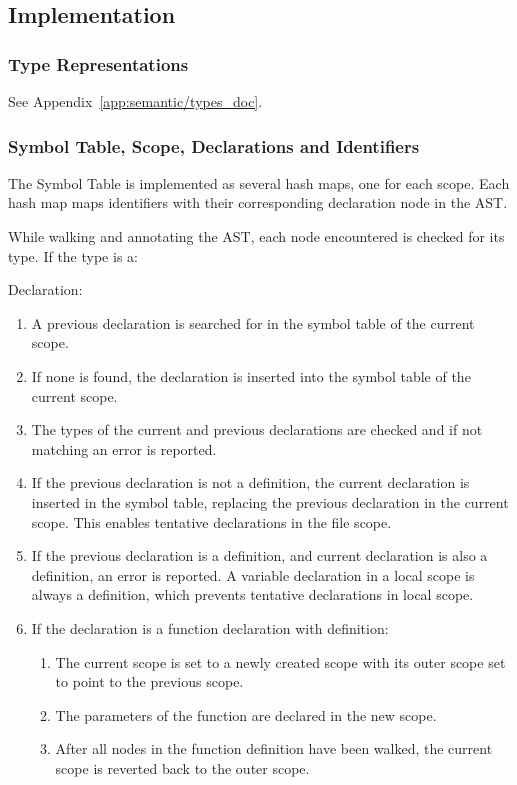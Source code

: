 \subsection{Implementation}

\subsubsection{Type Representations}

See Appendix~\ref{app:semantic/types_doc}.

\subsubsection{Symbol Table, Scope, Declarations and Identifiers}

The Symbol Table is implemented as several hash maps, one for each scope. Each hash map maps identifiers with their corresponding declaration node in the AST.

While walking and annotating the AST, each node encountered is checked for its type. If the type is a:

Declaration:
\begin{enumerate}
	\item A previous declaration is searched for in the symbol table of the current scope.
	\item If none is found, the declaration is inserted into the symbol table of the current scope.
	\item The types of the current and previous declarations are checked and if not matching an error is reported.
	\item If the previous declaration is not a definition, the current declaration is inserted in the symbol table, replacing the previous declaration in the current scope. This enables tentative declarations in the file scope.
	\item If the previous declaration is a definition, and current declaration is also a definition, an error is reported. A variable declaration in a local scope is always a definition, which prevents tentative declarations in local scope.
	\item If the declaration is a function declaration with definition:
	\begin{enumerate}[1.]
		\item The current scope is set to a newly created scope with its outer scope set to point to the previous scope.
		\item The parameters of the function are declared in the new scope.
		\item After all nodes in the function definition have been walked, the current scope is reverted back to the outer scope.
	\end{enumerate}
\end{enumerate}

